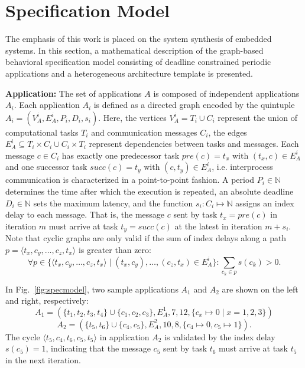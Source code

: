 \section{Specification Model}
\label{sec:model}
The emphasis of this work is placed on the system synthesis of embedded systems. 
In this section, a mathematical description of the graph-based behavioral specification model consisting of deadline constrained periodic applications and a heterogeneous architecture template is presented. %

\vspace*{.5mm}
\textbf{Application: }
The set of applications $A$ is composed of independent applications $A_i$. 
Each application $A_i$ is defined as a directed graph encoded by the quintuple $A_i=(V_{A}^i,E_{A}^i,P_i,D_i,s_i)$. 
Here, the vertices $V_A^i = T_i\cup C_i$ represent the union of computational tasks $T_i$ and communication messages $C_i$, 
the edges $E_A^i\subseteq T_i\times C_i \cup C_i\times T_i$ represent dependencies between tasks and messages. 
Each message $c\in C_i$ has exactly one predecessor task $pre(c)=t_x \text{ with } (t_x,c)\in E_A^i$ and one successor task $succ(c)=t_y \text{ with } (c,t_y)\in E_A^i$, 
i.e. interprocess communication is characterized in a point-to-point fashion.
A period $P_i\in\mathbb{N}$ determines the time after which the execution is repeated, 
an absolute deadline $D_i\in\mathbb{N}$ sets the maximum latency, 
and the function $s_i:C_i\mapsto\mathbb{N}$ assigns an index delay to each message. 
That is, the message $c$ sent by task $t_x=pre(c)$ in iteration $m$ must arrive at task $t_y=succ(c)$ at the latest in iteration $m+s_i$. 
Note that cyclic graphs are only valid if the sum of index delays along a path $p=\langle t_x,c_y,\ldots,c_z,t_x\rangle$ is greater than zero: 
$$\forall p\in\{\langle t_x,c_y,\ldots,c_z,t_x\rangle\mid (t_x, c_y), \ldots ,(c_z,t_x)\in E_A^i\}:\sum_{c_k\in p}s(c_k)> 0.$$ \par
In Fig.\ \!\ref{fig:specmodel}, two sample applications $A_1$ and $A_2$ are shown on the left and right, respectively: $$A_1=(\{t_1,t_2,t_3,t_4\}\cup\{c_1,c_2,c_3\},E_A^1,7,12,\{c_x\mapsto 0\mid x=1,2,3\})$$%
$$A_2=(\{t_5,t_6\}\cup\{c_4,c_5\},E_A^2,10,8,\{c_4\mapsto 0,c_5\mapsto 1\}).$$
The cycle $\langle t_5,c_4,t_6,c_5,t_5\rangle$ in application $A_2$ is validated by the index delay $s(c_5)=1$, indicating that the message $c_5$ sent by task $t_6$ must arrive at task $t_5$ in the next iteration.

